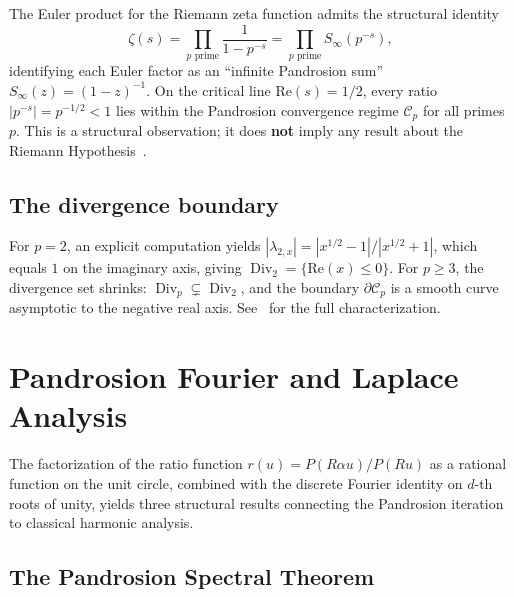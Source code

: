 \documentclass[10pt,a4paper,oneside]{book}
\theoremstyle{definition}
\theoremstyle{remark}
\DeclareMathOperator{\Div}{Div}
\begin{document}
The Euler product for the Riemann zeta function admits the structural identity
\[
  \zeta(s) = \prod_{p \text{ prime}} \frac{1}{1 - p^{-s}} = \prod_{p \text{ prime}} S_\infty(p^{-s}),
\]
identifying each Euler factor as an ``infinite Pandrosion sum'' $S_\infty(z) = (1-z)^{-1}$.  On the critical line $\mathrm{Re}(s) = 1/2$, every ratio $|p^{-s}| = p^{-1/2} < 1$ lies within the Pandrosion convergence regime $\mathcal{C}_p$ for all primes $p$.  This is a structural observation; it does \textbf{not} imply any result about the Riemann Hypothesis~\cite[\S6]{besevic2026complex}.

\subsection{The divergence boundary}
\label{sec:divergence}

For $p = 2$, an explicit computation yields $|\lambda_{2,x}| = |x^{1/2} - 1|/|x^{1/2} + 1|$, which equals $1$ on the imaginary axis, giving $\Div_2 = \{\mathrm{Re}(x) \leq 0\}$.  For $p \geq 3$, the divergence set shrinks: $\Div_p \subsetneq \Div_2$, and the boundary $\partial \mathcal{C}_p$ is a smooth curve asymptotic to the negative real axis.  See~\cite[\S7]{besevic2026complex} for the full characterization.

\section{Pandrosion Fourier and Laplace Analysis}
\label{sec:pandrosion_fourier}

The factorization of the ratio function $r(u) = P(R\alpha u)/P(Ru)$ as a rational function on the unit circle, combined with the discrete Fourier identity on $d$-th roots of unity, yields three structural results connecting the Pandrosion iteration to classical harmonic analysis.

\subsection{The Pandrosion Spectral Theorem}
\label{sec:spectral}
\end{document}
